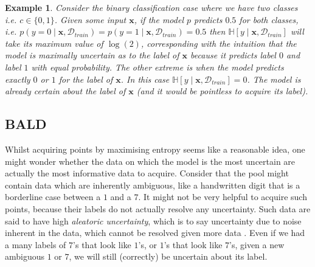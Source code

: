 \documentclass[11pt, a4paper, bibliography=totoc]{report}
\newcommand{\data}{\mathcal{D}}
\newcommand{\entropy}[1]{\mathbb{H} \left[ #1 \right] }
\newcommand{\x}{\mathbf{x}}
\newtheorem{example}{Example}
\begin{document}
\begin{example} \label{ex:max_ent}
	Consider the binary classification case where we have two classes i.e. $ c \in \{0, 1\} $. Given some input $ \x $, if the model $ p $ predicts $ 0.5 $ for both classes, i.e. $ p(y=0 \mid \x, \data_{train}) = p(y=1 \mid \x, \data_{train}) = 0.5 $ then $ \entropy{y \mid \x, \data_{train}} $ will take its maximum value of $ \log(2) $, corresponding with the intuition that the model is maximally uncertain as to the label of $ \x $ because it predicts label $ 0 $ and label $ 1 $ with equal probability. The other extreme is when the model predicts exactly $ 0 $ or $ 1 $ for the label of $ \x $. In this case $ \entropy{y \mid \x, \data_{train}} = 0 $. The model is already certain about the label of $ \x $ (and it would be pointless to acquire its label).
\end{example}

\subsection{BALD}
Whilst acquiring points by maximising entropy seems like a reasonable idea, one might wonder whether the data on which the model is the most uncertain are actually the most informative data to acquire. Consider that the pool might contain data which are inherently ambiguous, like a handwritten digit that is a borderline case between a $ 1 $ and a $ 7 $. It might not be very helpful to acquire such points, because their labels do not actually resolve any uncertainty. Such data are said to have high \textit{aleatoric uncertainty}, which is to say uncertainty due to noise inherent in the data, which cannot be resolved given more data \cite[p.~7]{Gal2017a}. Even if we had a many labels of $ 7 $'s that look like $ 1 $'s, or $ 1 $'s that look like $ 7 $'s, given a new ambiguous $ 1 $ or $ 7 $, we will still (correctly) be uncertain about its label.
\end{document}

